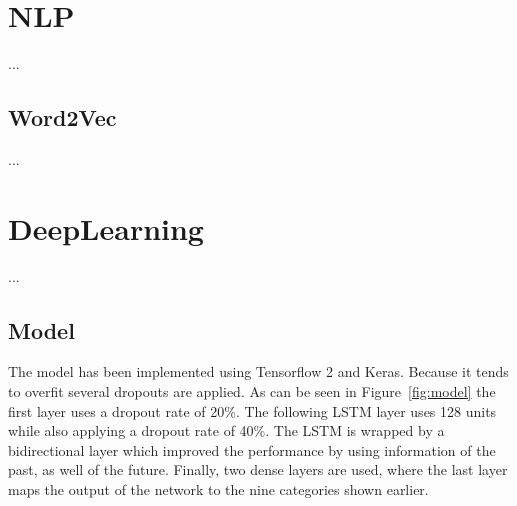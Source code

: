 \documentclass[11pt,a4paper]{article}
\begin{document}
\section{NLP}

...


\subsection{Word2Vec}

...%


\section{DeepLearning}

...


\subsection{Model}
The model has been implemented using Tensorflow 2 and Keras. Because it tends to overfit several dropouts are applied. As can be seen in Figure~\ref{fig:model} the first layer uses a dropout rate of 20\%. The following LSTM layer uses 128 units while also applying a dropout rate of 40\%. The LSTM is wrapped by a bidirectional layer which improved the performance by using information of the past, as well of the future. Finally, two dense layers are used, where the last layer maps the output of the network to the nine categories shown earlier.
\end{document}
